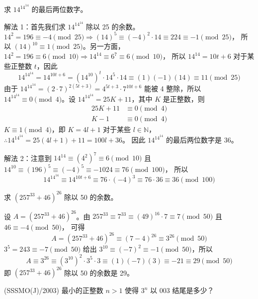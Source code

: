 \begin{questions}
\question 求 $14^{14^{14}}$ 的最后两位数字。

\begin{solution}
解法 1：首先我们求 $14^{14^{14}}$ 除以 25 的余数。
$14^2 = 196 \equiv -4 \pmod{25} \Rightarrow (14)^5 \equiv (-4)^2 \cdot 14 \equiv 224 \equiv -1 \pmod{25}$，
所以 $(14)^{10} \equiv 1 \pmod{25}$。另一方面，
$14^2 = 196 \equiv 6 \pmod{10} \Rightarrow 14^{14} \equiv 6^7 \equiv 6 \pmod{10}$，
所以 $14^{14} = 10t + 6$ 对于某些正整数 $t$，因此
\[
14^{14^{14}} = 14^{10t+6} = (14^{10})^t \cdot 14^5 \cdot 14 \equiv (1) (-1) (14) \equiv 11 \pmod{25}
\]
由于 $14^{14^{14}} = (2 \cdot 7)^{2(5t+3)} = 4^{5t+3} \cdot 7^{10t+6}$ 能被 4 整除，所以 $14^{14^{14}} \equiv 0 \pmod 4$。设 $14^{14^{14}} = 25K + 11$，其中 $K$ 是正整数，则
\begin{align*}
25K + 11 &\equiv 0 \pmod 4 \\
K - 1 &\equiv 0 \pmod 4
\end{align*}
$K \equiv 1 \pmod 4$，即 $K = 4l + 1$ 对于某些 $l \in \mathbb{N}$，
$\therefore 14^{14^{14}} = 25(4l + 1) + 11 = 100l + 36$。
因此 $14^{14^{14}}$ 的最后两位数字是 36。

解法 2：注意到 $14^{14} \equiv (4^2)^7 \equiv 6 \pmod{10}$ 且
$14^{10} \equiv (196)^5 \equiv (-4)^5 \equiv -1024 \equiv 76 \pmod{100}$，
所以
\[
14^{14^{14}} \equiv 14^{10t+6} \equiv 76 \cdot (-4)^3 \equiv 76 \cdot 36 \equiv 36 \pmod{100}
\]
\end{solution}

\question 求 $(257^{33} + 46)^{26}$ 除以 50 的余数。

\begin{solution}
设 $A = (257^{33} + 46)^{26}$。由
$257^{33} \equiv 7^{33} \equiv (49)^{16} \cdot 7 \equiv 7 \pmod{50}$ 且 $46 \equiv -4 \pmod{50}$，
可得
\[
A = (257^{33} + 46)^{26} \equiv (7 - 4)^{26} \equiv 3^{26} \pmod{50}
\]
$3^5 = 243 \equiv -7 \pmod{50}$ 给出 $3^{10} \equiv (-7)^2 \equiv -1 \pmod{50}$，所以
\[
A \equiv 3^{26} \equiv (3^{10})^2 \cdot 3^5 \cdot 3 \equiv (1)(-7)(3) \equiv -21 \equiv 29 \pmod{50}
\]
即 $(257^{33} + 46)^{26}$ 除以 50 的余数是 29。
\end{solution}

\question (SSSMO(J)/2003) 最小的正整数 $n > 1$ 使得 $3^n$ 以 003 结尾是多少？


\end{questions}
